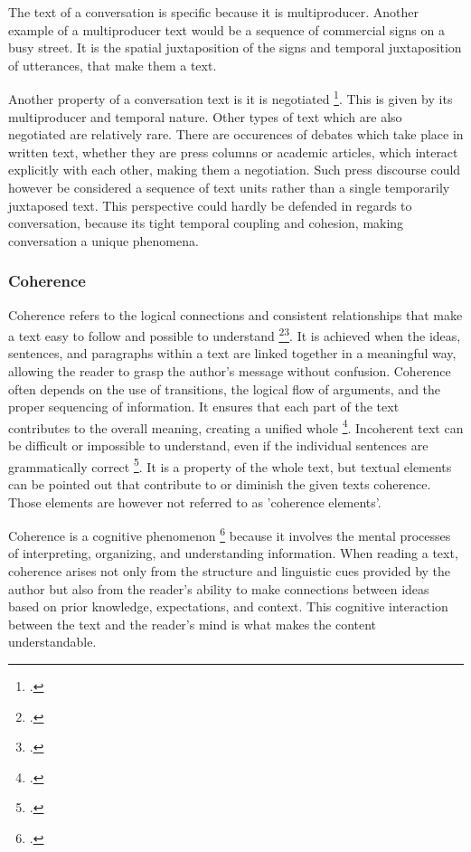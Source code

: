 \documentclass[12pt]{report}
\begin{document}
{\par
    The text of a conversation is specific because it is multiproducer.
    Another example of a multiproducer text
    would be a sequence of commercial signs on a busy street.
    It is the spatial juxtaposition of the signs and temporal juxtaposition of utterances,
    that make them a text.

    \par
    Another property of a conversation text is it is negotiated \footcite{Sacks1992}.
    This is given by its multiproducer and temporal nature.
    Other types of text which are also negotiated are relatively rare.
    There are occurences of debates which take place in written text,
    whether they are press columns or academic articles, which
    interact explicitly with each other, making them a negotiation.
    Such press discourse could however be considered
    a sequence of text units rather than a single temporarily juxtaposed text.
    This perspective could hardly be defended in regards to conversation, because
    its tight temporal coupling and cohesion,
    making conversation a unique phenomena.

\subsubsection{Coherence}
\par
    Coherence refers to the logical connections and consistent relationships that
    make a text easy to follow and possible to understand \footcite[p.~83]{givón2020coherence}\footcite[p.~9]{hrbacek1994}.
    It is achieved when the ideas, sentences, and paragraphs within a text are linked together in a meaningful way,
    allowing the reader to grasp the author's message without confusion.
    Coherence often depends on the use of transitions, the logical flow of arguments, and the proper sequencing of information.
    It ensures that each part of the text contributes to the overall meaning, creating a unified whole \footcite[p.~28]{hrbacek1994}.
    Incoherent text can be difficult or impossible to understand, even if the individual sentences are grammatically correct \footcite[p.~30]{hrbacek1994}.
    It is a property of the whole text, but
    textual elements can be pointed out that contribute to or diminish the given texts coherence.
    Those elements are however not referred to as 'coherence elements'.

\par
    Coherence is a cognitive phenomenon \footcite{Roberts01101993} because
    it involves the mental processes of interpreting, organizing, and understanding information.
    When reading a text,
    coherence arises not only from the structure and linguistic cues provided by the author but
    also from the reader's ability to
    make connections between ideas based on prior knowledge, expectations, and context.
    This cognitive interaction between the text and the reader’s mind is what makes the content understandable.

}
\end{document}
